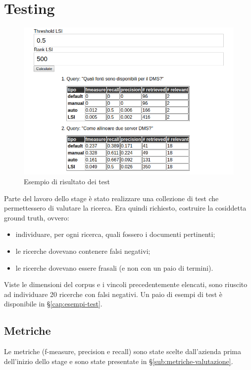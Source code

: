 \chapter{Testing}
\label{cap:testing}
\begin{center}
    \begin{figure}
        \includegraphics[scale=0.5]{immagini/ir_eval.png}
        \caption{Esempio di risultato dei test}
     \end{figure}
\end{center}
    
    
    Parte del lavoro dello stage è stato realizzare una collezione di test che permettessero di valutare la ricerca. Era quindi richiesto, costruire la cosiddetta ground truth, ovvero:
    \begin{itemize}
        \item individuare, per ogni ricerca, quali fossero i documenti pertinenti;
        \item le ricerche dovevano contenere falsi negativi;
        \item le ricerche dovevano essere frasali (e non con un paio di termini).
    \end{itemize}

    Viste le dimensioni del corpus e i vincoli precedentemente elencati, sono riuscito ad individuare 20 ricerche con falsi negativi. Un paio di esempi di test è disponibile in §\ref{cap:esempi-test}.
    \section{Metriche}
    Le metriche (f-measure, precision e recall) sono state scelte dall'azienda prima dell'inizio dello stage e sono state presentate in §\ref{sub:metriche-valutazione}.

